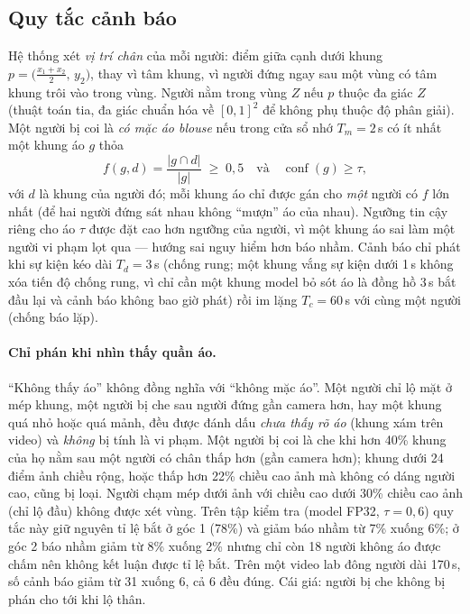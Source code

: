 \documentclass[12pt,a4paper]{article}
\begin{document}
\subsection{Quy tắc cảnh báo}

Hệ thống xét \emph{vị trí chân} của mỗi người: điểm giữa cạnh dưới khung $p=\big(\tfrac{x_1+x_2}{2},\,y_2\big)$,
thay vì tâm khung, vì người đứng ngay sau một vùng có tâm khung trôi vào trong vùng. Người nằm trong vùng $Z$ nếu $p$
thuộc đa giác $Z$ (thuật toán tia, đa giác chuẩn hóa về $[0,1]^2$ để không phụ thuộc độ phân giải). Một người bị coi
là \emph{có mặc áo blouse} nếu trong cửa sổ nhớ $T_m=2$\,s có ít nhất một khung áo $g$ thỏa
\begin{equation}
  f(g,d)=\frac{|g\cap d|}{|g|}\;\ge\;0{,}5
  \quad\text{và}\quad
  \operatorname{conf}(g)\ge\tau,
\end{equation}
với $d$ là khung của người đó; mỗi khung áo chỉ được gán cho \emph{một} người có $f$ lớn nhất (để hai người đứng sát
nhau không ``mượn'' áo của nhau). Ngưỡng tin cậy riêng cho áo $\tau$ được đặt cao hơn ngưỡng của người, vì một khung
áo sai làm một người vi phạm lọt qua --- hướng sai nguy hiểm hơn báo nhầm. Cảnh báo chỉ phát khi sự kiện kéo dài
$T_d=3$\,s (chống rung; một khung vắng sự kiện dưới 1\,s không xóa tiến độ chống rung, vì chỉ cần một khung model bỏ sót áo là đồng hồ 3\,s
bắt đầu lại và cảnh báo không bao giờ phát) rồi im lặng $T_c=60$\,s với cùng một người (chống báo lặp).

\paragraph{Chỉ phán khi nhìn thấy quần áo.} ``Không thấy áo'' không đồng nghĩa với ``không mặc áo''. Một người chỉ lộ mặt ở mép khung,
một người bị che sau người đứng gần camera hơn, hay một khung quá nhỏ hoặc quá mảnh, đều được đánh dấu \emph{chưa thấy rõ áo}
(khung xám trên video) và \emph{không} bị tính là vi phạm. Một người bị coi là che khi hơn 40\% khung của họ nằm sau một người có chân thấp hơn
(gần camera hơn); khung dưới 24 điểm ảnh chiều rộng, hoặc thấp hơn 22\% chiều cao ảnh mà không có dáng người cao, cũng bị loại. Người chạm mép
dưới ảnh với chiều cao dưới 30\% chiều cao ảnh (chỉ lộ đầu) không được xét vùng. Trên tập kiểm tra (model FP32, $\tau=0{,}6$) quy tắc này
giữ nguyên tỉ lệ bắt ở góc 1 (78\%) và giảm báo nhầm từ 7\% xuống 6\%; ở góc 2 báo nhầm giảm từ 8\% xuống 2\% nhưng chỉ còn 18 người không
áo được chấm nên không kết luận được tỉ lệ bắt. Trên một video lab đông người dài 170\,s, số cảnh báo giảm từ 31 xuống 6, cả 6 đều
đúng. Cái giá: người bị che không bị phán cho tới khi lộ thân.
\end{document}
